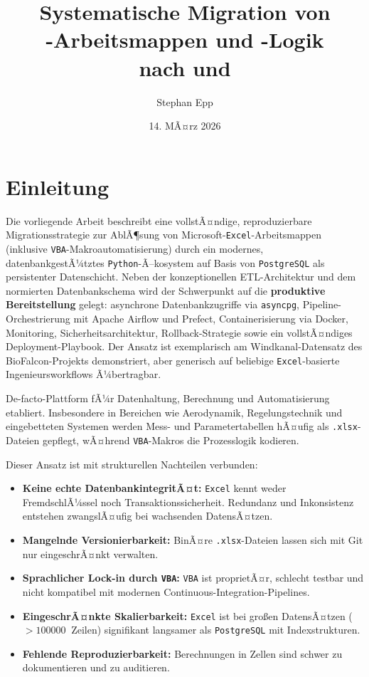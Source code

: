 ﻿\documentclass[12pt,a4paper]{report}
\title{Systematische Migration von\\[0.3em]
	\excel-Arbeitsmappen und \vba-Logik\\[0.3em]
	nach \pg{} und \py}
\author{Stephan Epp}
\date{14. MÃ¤rz 2026}
\theoremstyle{definition}
\theoremstyle{remark}
\newcommand{\excel}{\texttt{Excel}}
\newcommand{\vba}{\texttt{VBA}}
\newcommand{\pg}{\texttt{PostgreSQL}}
\newcommand{\py}{\texttt{Python}}
\newcommand{\code}[1]{\texttt{#1}}
\begin{document}
\maketitle
\tableofcontents
\newpage

\chapter{Einleitung}
Die vorliegende Arbeit beschreibt eine vollstÃ¤ndige, reproduzierbare
Migrationsstrategie zur AblÃ¶sung von Microsoft-\excel-Arbeitsmappen
(inklusive \vba-Makroautomatisierung) durch ein modernes,
datenbankgestÃ¼tztes \py-Ã–kosystem auf Basis von \pg{} als persistenter
Datenschicht. Neben der konzeptionellen ETL-Architektur und dem
normierten Datenbankschema wird der Schwerpunkt auf die
\textbf{produktive Bereitstellung} gelegt: asynchrone Datenbankzugriffe
via \code{asyncpg}, Pipeline-Orchestrierung mit Apache Airflow und Prefect,
Containerisierung via Docker, Monitoring, Sicherheitsarchitektur,
Rollback-Strategie sowie ein vollstÃ¤ndiges Deployment-Playbook.
Der Ansatz ist exemplarisch am Windkanal-Datensatz des BioFalcon-Projekts
demonstriert, aber generisch auf beliebige \excel-basierte Ingenieursworkflows
Ã¼bertragbar.

De-facto-Plattform fÃ¼r Datenhaltung, Berechnung und Automatisierung
etabliert. Insbesondere in Bereichen wie Aerodynamik, Regelungstechnik
und eingebetteten Systemen werden Mess- und Parametertabellen hÃ¤ufig als
\code{.xlsx}-Dateien gepflegt, wÃ¤hrend \vba-Makros die Prozesslogik kodieren.

Dieser Ansatz ist mit strukturellen Nachteilen verbunden:

\begin{itemize}[leftmargin=1.5em]
  \item \textbf{Keine echte DatenbankintegritÃ¤t:} \excel{} kennt weder
        FremdschlÃ¼ssel noch Transaktionssicherheit. Redundanz und
        Inkonsistenz entstehen zwangslÃ¤ufig bei wachsenden DatensÃ¤tzen.
  \item \textbf{Mangelnde Versionierbarkeit:} BinÃ¤re \code{.xlsx}-Dateien
        lassen sich mit Git nur eingeschrÃ¤nkt verwalten.
  \item \textbf{Sprachlicher Lock-in durch \vba:} \vba{} ist proprietÃ¤r,
        schlecht testbar und nicht kompatibel mit modernen
        Continuous-Integration-Pipelines.
  \item \textbf{EingeschrÃ¤nkte Skalierbarkeit:} \excel{} ist bei gro\ss{}en
        DatensÃ¤tzen ($> \SI{100000}{}$ Zeilen) signifikant langsamer als
        \pg{} mit Indexstrukturen.
  \item \textbf{Fehlende Reproduzierbarkeit:} Berechnungen in Zellen sind
        schwer zu dokumentieren und zu auditieren.
\end{itemize}
\end{document}
